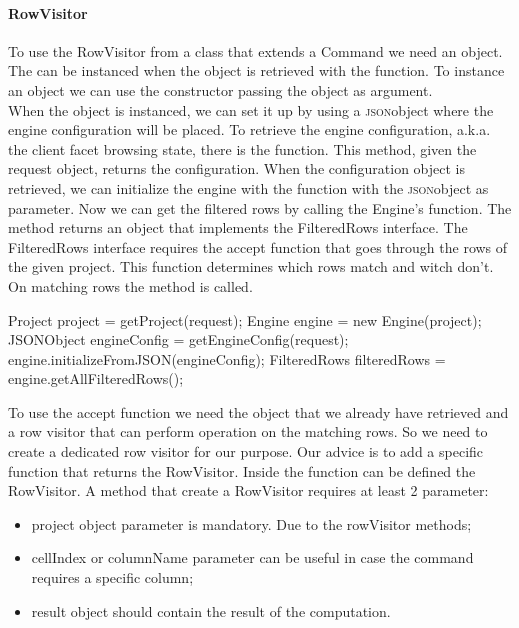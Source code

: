 \paragraph{RowVisitor} To use the RowVisitor from a class that extends a Command we need an   object. The  can be instanced when the  object is retrieved with the  function. To instance an  object we can use the constructor passing the  object as argument.\\
When the  object is instanced, we can set it up by using a \textsc{json}object where the engine configuration will be placed. To retrieve the engine configuration, a.k.a. the client facet browsing state, there is the  function. This method, given the request object, returns the configuration. When the configuration object is retrieved, we can initialize the engine with the function  with the \textsc{json}object as parameter. Now we can get the filtered rows by calling the Engine's  function.
The  method returns an object that implements the FilteredRows interface. The FilteredRows interface requires the accept function that goes through the rows of the given project. This function determines which rows match and witch don't. On matching rows the  method is called.
\begin{code}
Project project = getProject(request);
Engine engine = new Engine(project);
JSONObject engineConfig = getEngineConfig(request);
engine.initializeFromJSON(engineConfig);
FilteredRows filteredRows = engine.getAllFilteredRows();
\end{code} 
To use the accept function we need the  object that we already have retrieved and a row visitor that can perform operation on the matching rows. So we need to create a dedicated row visitor for our purpose. Our advice is to add a specific function that returns the RowVisitor. Inside the function can be defined the RowVisitor.
A method that create a RowVisitor requires at least 2 parameter: 
\begin{itemize}
	\item \textsf{project} object parameter is mandatory. Due to the rowVisitor methods;
	\item \textsf{cellIndex} or \textsf{columnName} parameter can be useful in case the command requires a specific column;
	\item \textsf{result} object should contain the result of the computation.
\end{itemize}

